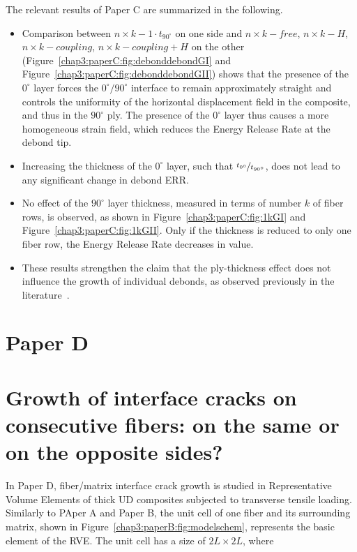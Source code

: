 The relevant results of Paper C are summarized in the following.

\begin{itemize}
\item Comparison between $n\times k-1\cdot t_{90^{\circ}}$ on one side and $n\times k-free$, $n\times k-H$, $n\times k-coupling$, $n\times k-coupling+H$ on the other (Figure~\ref{chap3:paperC:fig:debonddebondGI} and Figure~\ref{chap3:paperC:fig:debonddebondGII}) shows that the presence of the $0^{\circ}$ layer forces the $0^{\circ}/90^{\circ}$ interface to remain approximately straight and controls the uniformity of the horizontal displacement field in the composite, and thus in the $90^{\circ}$ ply. The presence of the $0^{\circ}$ layer thus causes a more homogeneous strain field, which reduces the Energy Release Rate at the debond tip.
\item Increasing the thickness of the $0^{\circ}$ layer, such that $\nicefrac{t_{0^{\circ}}}{t_{90^{\circ}}}$, does not lead to any significant change in debond ERR.
\item No effect of the $90^{\circ}$ layer thickness, measured in terms of number $k$ of fiber rows, is observed, as shown in Figure~\ref{chap3:paperC:fig:1kGI} and Figure~\ref{chap3:paperC:fig:1kGII}. Only if the thickness is reduced to only one fiber row, the Energy Release Rate decreases in value.
\item These results strengthen the claim that the ply-thickness effect does not influence the growth of individual debonds, as observed previously in the literature~\cite{Saito2012,Herraez2015,Velasco2018, Paris2018}.
\end{itemize}

\section{Paper D}\label{chap3:paperD}
\section*{Growth of interface cracks on consecutive fibers: on the same or on the opposite sides?}

In Paper D, fiber/matrix interface crack growth is studied in Representative Volume Elements of thick UD composites subjected to transverse tensile loading. Similarly to PAper A and Paper B, the unit cell of one fiber and its surrounding matrix, shown in Figure~\ref{chap3:paperB:fig:modelschem}, represents the basic element of the RVE. The unit cell has a size of $2L\times2L$, where


